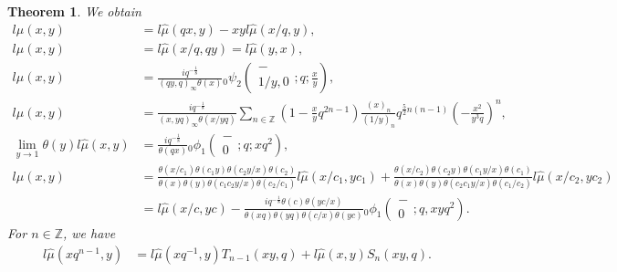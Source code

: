 \documentclass[a4paper]{article}
\newcommand{\Zz}{\mathbb{Z}}
\newcommand{\hyper}[4]{\left( \begin{matrix} #1 \\ #2 \end{matrix};#3;#4\right)}
\numberwithin{equation}{section}
\theoremstyle{plain}
\newtheorem{thm}{Theorem}
\begin{document}
\begin{thm}
\label{thm: lmu property}
We obtain
\begin{align}
\label{eq: lmu formula 1}
l\widehat{\mu}(x,y)
   &=
   l\widehat{\mu}(q x,y)-x y l\widehat{\mu}(x/q,y), \\
\label{eq: lmu formula 2}
l\widehat{\mu}(x,y)
   &=
   l\widehat{\mu}(x/q,q y)
   =
   l\widehat{\mu}(y,x), \\
\label{eq: lmu formula 3}
l\widehat{\mu}(x,y)
  &=
  \frac{iq^{-\frac{1}{8}}}{(qy,q)_\infty\theta(x)}{}_0\psi_2\hyper{-}{1/y,0}{q}{\frac{x}{y}}, \\
\label{eq: lmu formula 3.5}
l\widehat{\mu}(x,y)
  &=
  \frac{iq^{-\frac{1}{8}}}{(x,y q)_\infty\theta(x/y q)}\sum_{n\in\Zz}\left(1-\frac{x}{y}q^{2n-1}\right)\frac{(x)_n}{(1/y)_n}q^{\frac{5}{2}n(n-1)}\left(-\frac{x^2}{y^3 q}\right)^n, \\
\label{eq: lmu formula 4}
\lim_{y\to 1}\theta(y)l\widehat{\mu}(x,y)
  & =
  \frac{iq^{-\frac{1}{8}}}{\theta(qx)}{}_0\phi_1\hyper{-}{0}{q}{x q^2}, \\
\label{eq: lmu formula 5}
l\widehat{\mu}(x,y)
   &=
   \frac{\theta(x/c_1)\theta(c_1 y)\theta(c_2y/x)\theta(c_2)}{\theta(x)\theta(y)\theta(c_1c_2y/x)\theta(c_2/c_1)}
      l\widehat{\mu}(x/{c}_{1},y{c}_{1})
   +
   \frac{\theta(x/{c}_{2})\theta({c}_{2}y)\theta ({c}_{1}y/x)\theta ({c}_{1})}{\theta (x)\theta (y)\theta ({c}_{2}{c}_{1}y/x)\theta ({c}_{1}/{c}_{2})}
   l\widehat{\mu}(x/{c}_{2},y{c}_{2})\\
\label{eq: lmu formula 6}
   &=
   l\widehat{\mu}(x/c,y c)
     -\frac{iq^{-\frac{1}{8}}\theta(c)\theta (y c/x)}{\theta (x q)\theta (y q)\theta (c/x)\theta (y c)} 
       {}_0\phi_{1}\left(\begin{matrix} - \\ 0 \end{matrix};q,x y q^2\right).
\end{align}
For $n\in\Zz$, we have
\begin{align}
\label{eq: lmu formula 7}
l\widehat{\mu}(xq^{n-1},y)&=l\widehat{\mu}(x q^{-1},y)T_{n-1}(xy,q)+l\widehat{\mu}(x,y)S_{n}(xy,q). 
\end{align}
\end{thm}
\end{document}

